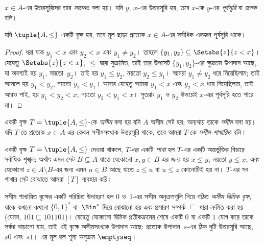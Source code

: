 \documentclass[../../../include/open-logic-section]{subfiles}
\begin{document}
$x \in A$-এর উত্তরসূরিদের তার \emph{সন্তান}ও বলা হয়। যদি $y$, $x$-এর উত্তরসূরি হয়, তবে $x$-কে $y$-এর \emph{পূর্বসূরি} বা \emph{জনক} বলি।

\begin{prop}
যদি $\tuple{A,\le}$ একটি বৃক্ষ হয়, তবে মূল ছাড়া প্রত্যেক $x \in A$-এর সর্বাধিক একজন পূর্বসূরি থাকে।
\end{prop}

\begin{proof}
  ধরা যাক $y_1 < x$ এবং $y_2 < x$ এবং $y_1 \neq y_2$। তাহলে $\{y_1, y_2\} \subseteq \Setabs{z}{z<x}$। যেহেতু $\Setabs{z}{z<x}$, $\le$ দ্বারা সুক্রমিত, তাই তার উপসেট $\{y_1, y_2\}$-এর ক্ষুদ্রতম উপাদান আছে, যা অবশ্যই হয় $y_1$, নয়তো~$y_2$। তাই হয় $y_1 \le y_2$, নয়তো $y_2 \le y_1$। আমরা $y_1 \neq y_2$ ধরে নিয়েছিলাম; তাই আসলে হয় $y_1 < y_2$, নয়তো $y_2 < y_1$। আবার যেহেতু আমরা $y_1 < x$ এবং $y_2 < x$ ধরে নিয়েছিলাম, তাই আরও পাই, হয় $y_1 < y_2 < x$, নয়তো $y_2 < y_1 < x$। সুতরাং $y_1$ ও $y_2$ উভয়েই $x$-এর পূর্বসূরি হতে পারে না।
\end{proof}

\begin{defn}
একটি বৃক্ষ $T = \tuple{A, \le}$-কে \emph{অসীম} বলা হয় যদি $A$ অসীম সেট হয়; অন্যথায় তাকে \emph{সসীম} বলা হয়। যদি $T$-তে প্রত্যেক $x \in A$-এর কেবল সসীমসংখ্যক উত্তরসূরি থাকে, তবে আমরা $T$-কে \emph{সসীম শাখায়িত} বলি।
\end{defn}

\begin{defn}[শাখা]
একটি বৃক্ষ $T = \tuple{A, \le}$ দেওয়া থাকলে, $T$-এর একটি \emph{শাখা} হল $T$-এর একটি অন্তর্ভুক্তির বিচারে সর্বাধিক শৃঙ্খল; অর্থাৎ এমন সেট $B \subseteq A$ যাতে যেকোনো $x, y \in B$-এর জন্য হয় $x \le y$, নয়তো $y \le x$, এবং যেকোনো $z \in A \setminus B$-এর জন্য এমন $u \in B$ আছে যাতে $z \le u$ বা $u \le z$ কোনোটিই হয় না।
%
$T$-এর সব শাখার সেট বোঝাতে আমরা $[T]$ ব্যবহার করি।
\end{defn}

\begin{ex}
সসীম শাখায়িত বৃক্ষের একটি পরিচিত উদাহরণ হল $0$ ও~$1$-এর সসীম অনুক্রমগুলি নিয়ে গঠিত \emph{অসীম দ্বিমিক বৃক্ষ}, যাকে কখনো কখনো $\{0,1\}^*$ বা~$\Bin^*$ দিয়ে বোঝানো হয় এবং প্রসারণ সম্পর্ক $\sqsubseteq$ দ্বারা ক্রমিত করা হয় (যেমন, $101 \sqsubseteq 101101$)। যেহেতু যেকোনো দ্বিমিক প্রতীকক্রমের শেষে একটি $0$ বা একটি $1$ যোগ করে তাকে সর্বদা বাড়ানো যায়, তাই এই বৃক্ষে অসীমসংখ্যক উপাদান আছে: প্রত্যেক উপাদান~$s$-এর ঠিক দুটি উত্তরসূরি আছে, $s0$ এবং~$s1$। এর মূল হল শূন্য অনুক্রম $\emptyseq$।
\end{ex}
\end{document}
